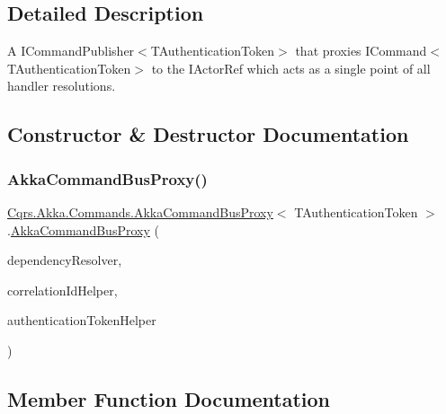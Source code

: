 \subsection{Detailed Description}
A I\+Command\+Publisher$<$\+T\+Authentication\+Token$>$ that proxies I\+Command$<$\+T\+Authentication\+Token$>$ to the I\+Actor\+Ref which acts as a single point of all handler resolutions. 



\subsection{Constructor \& Destructor Documentation}
\mbox{\label{classCqrs_1_1Akka_1_1Commands_1_1AkkaCommandBusProxy_ad9a3fa7aa546bc2c398d4f52d0659656}} 
\subsubsection{\texorpdfstring{Akka\+Command\+Bus\+Proxy()}{AkkaCommandBusProxy()}}
{\footnotesize\ttfamily \hyperlink{classCqrs_1_1Akka_1_1Commands_1_1AkkaCommandBusProxy}{Cqrs.\+Akka.\+Commands.\+Akka\+Command\+Bus\+Proxy}$<$ T\+Authentication\+Token $>$.\hyperlink{classCqrs_1_1Akka_1_1Commands_1_1AkkaCommandBusProxy}{Akka\+Command\+Bus\+Proxy} (\begin{DoxyParamCaption}\item[{\hyperlink{interfaceCqrs_1_1Configuration_1_1IDependencyResolver}{I\+Dependency\+Resolver}}]{dependency\+Resolver,  }\item[{I\+Correlation\+Id\+Helper}]{correlation\+Id\+Helper,  }\item[{\hyperlink{interfaceCqrs_1_1Authentication_1_1IAuthenticationTokenHelper}{I\+Authentication\+Token\+Helper}$<$ T\+Authentication\+Token $>$}]{authentication\+Token\+Helper }\end{DoxyParamCaption})}



\subsection{Member Function Documentation}
\mbox{\label{classCqrs_1_1Akka_1_1Commands_1_1AkkaCommandBusProxy_a410c0fe52016d04de950b1ae767d2ccb}} 
